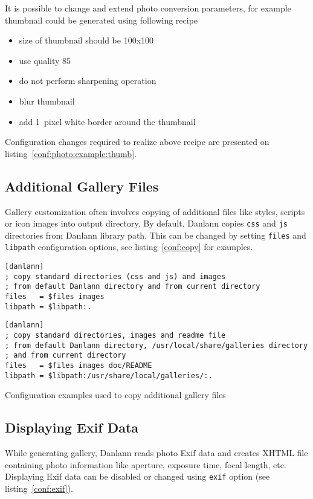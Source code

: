 \documentclass{article}
\begin{document}
It is possible to change and extend photo conversion parameters, for example
thumbnail could be generated using following recipe
\begin{itemize}
\item size of thumbnail should be 100x100
\item use quality 85
\item do not perform sharpening operation
\item blur thumbnail 
\item add 1~pixel white border around the thumbnail
\end{itemize}
Configuration changes required to realize above recipe are presented on
listing~\ref{conf:photo:example:thumb}.

\subsection{Additional Gallery Files}\label{files}
Gallery customization often involves copying of additional files like
styles, scripts or icon images into output directory. By default, Danlann copies
\texttt{css} and \texttt{js} directories from Danlann library path. This
can be changed by setting \texttt{files} and \texttt{libpath} configuration
options, see listing~\ref{conf:copy} for examples.

\begin{listing}
\begin{lstlisting}
[danlann]
; copy standard directories (css and js) and images
; from default Danlann directory and from current directory
files   = $files images
libpath = $libpath:.
\end{lstlisting}

\begin{lstlisting}
[danlann]
; copy standard directories, images and readme file
; from default Danlann directory, /usr/local/share/galleries directory
; and from current directory
files   = $files images doc/README
libpath = $libpath:/usr/share/local/galleries/:.
\end{lstlisting}
\caption{Configuration examples used to copy additional gallery files}\label{conf:copy}
\end{listing}

\subsection{Displaying Exif Data}\label{exif}
While generating gallery, Danlann reads photo Exif data and creates
XHTML file containing photo information like aperture,
exposure time, focal length, etc. Displaying Exif data can be disabled
or changed using \texttt{exif} option (see listing~\ref{conf:exif}).
\end{document}
